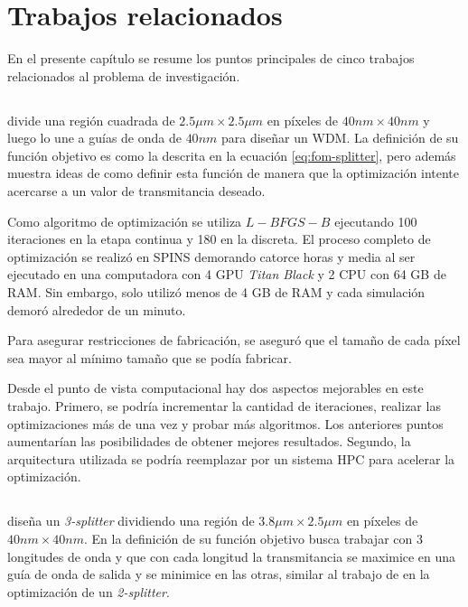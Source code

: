 \chapter{Trabajos relacionados}

En el presente capítulo se resume los puntos principales de cinco trabajos relacionados al problema de investigación.

\section{\cite{Su2020}}

\cite{Su2020} divide una región cuadrada de $2.5 \mu m \times 2.5 \mu m$ en píxeles de $40 nm \times 40 nm$ y luego lo une a guías de onda de $40 nm$ para diseñar un WDM. 
La definición de su función objetivo es como la descrita en la ecuación \ref{eq:fom-splitter}, pero además muestra ideas de como definir esta función de manera que la optimización intente acercarse a un valor de transmitancia deseado.

Como algoritmo de optimización se utiliza $L-BFGS-B$ ejecutando 100 iteraciones en la etapa continua y 180 en la discreta.
El proceso completo de optimización se realizó en SPINS demorando catorce horas y media al ser ejecutado en una computadora con 4 GPU \emph{Titan Black} y 2 CPU con 64 GB de RAM.
Sin embargo, solo utilizó menos de 4 GB de RAM y cada simulación demoró alrededor de un minuto.

Para asegurar restricciones de fabricación, \cite{Su2020} se aseguró que el tamaño de cada píxel sea mayor al mínimo tamaño que se podía fabricar.

Desde el punto de vista computacional hay dos aspectos mejorables en este trabajo. 
Primero, se podría incrementar la cantidad de iteraciones, realizar las optimizaciones más de una vez y probar más algoritmos.
Los anteriores puntos aumentarían las posibilidades de obtener mejores resultados.
Segundo, la arquitectura utilizada se podría reemplazar por un sistema HPC para acelerar la optimización.

\section{\cite{Piggott2017}}

\cite{Piggott2017} diseña un \emph{3-splitter} dividiendo una región de $3.8 \mu m \times 2.5 \mu m$ en píxeles de $40 nm \times 40 nm$.
En la definición de su función objetivo busca trabajar con 3 longitudes de onda y que con cada longitud la transmitancia se maximice en una guía de onda de salida y se minimice en las otras, similar al trabajo de \cite{Su2020} en la optimización de un \emph{2-splitter}.

